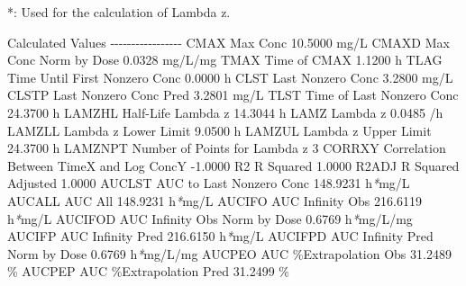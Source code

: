 \documentclass[
  11pt,
  krantz2, a4paper, twoside]{krantz}
\newenvironment{Shaded}{\begin{snugshade}}{\end{snugshade}}
\newcommand{\AttributeTok}[1]{\textcolor[rgb]{0.77,0.63,0.00}{#1}}
\newcommand{\ExtensionTok}[1]{#1}
\newcommand{\NormalTok}[1]{#1}
\newcommand{\PreprocessorTok}[1]{\textcolor[rgb]{0.56,0.35,0.01}{\textit{#1}}}
\theoremstyle{definition}
\theoremstyle{definition}
\theoremstyle{definition}
\theoremstyle{definition}
\theoremstyle{remark}
\begin{document}
\begin{Shaded}
\begin{Highlighting}[]
\ExtensionTok{*:}\NormalTok{ Used for the calculation of Lambda z.}


\ExtensionTok{Calculated}\NormalTok{ Values}
\ExtensionTok{{-}{-}{-}{-}{-}{-}{-}{-}{-}{-}{-}{-}{-}{-}{-}{-}{-}}
\ExtensionTok{CMAX}\NormalTok{       Max Conc                                       10.5000 mg/L}
\ExtensionTok{CMAXD}\NormalTok{      Max Conc Norm by Dose                           0.0328 mg/L/mg}
\ExtensionTok{TMAX}\NormalTok{       Time of CMAX                                    1.1200 h}
\ExtensionTok{TLAG}\NormalTok{       Time Until First Nonzero Conc                   0.0000 h}
\ExtensionTok{CLST}\NormalTok{       Last Nonzero Conc                               3.2800 mg/L}
\ExtensionTok{CLSTP}\NormalTok{      Last Nonzero Conc Pred                          3.2801 mg/L}
\ExtensionTok{TLST}\NormalTok{       Time of Last Nonzero Conc                      24.3700 h}
\ExtensionTok{LAMZHL}\NormalTok{     Half{-}Life Lambda z                             14.3044 h}
\ExtensionTok{LAMZ}\NormalTok{       Lambda z                                        0.0485 /h}
\ExtensionTok{LAMZLL}\NormalTok{     Lambda z Lower Limit                            9.0500 h}
\ExtensionTok{LAMZUL}\NormalTok{     Lambda z Upper Limit                           24.3700 h}
\ExtensionTok{LAMZNPT}\NormalTok{    Number of Points for Lambda z                   3}
\ExtensionTok{CORRXY}\NormalTok{     Correlation Between TimeX and Log ConcY        }\AttributeTok{{-}1.0000} 
\ExtensionTok{R2}\NormalTok{         R Squared                                       1.0000 }
\ExtensionTok{R2ADJ}\NormalTok{      R Squared Adjusted                              1.0000 }
\ExtensionTok{AUCLST}\NormalTok{     AUC to Last Nonzero Conc                      148.9231 h}\PreprocessorTok{*}\NormalTok{mg/L}
\ExtensionTok{AUCALL}\NormalTok{     AUC All                                       148.9231 h}\PreprocessorTok{*}\NormalTok{mg/L}
\ExtensionTok{AUCIFO}\NormalTok{     AUC Infinity Obs                              216.6119 h}\PreprocessorTok{*}\NormalTok{mg/L}
\ExtensionTok{AUCIFOD}\NormalTok{    AUC Infinity Obs Norm by Dose                   0.6769 h}\PreprocessorTok{*}\NormalTok{mg/L/mg}
\ExtensionTok{AUCIFP}\NormalTok{     AUC Infinity Pred                             216.6150 h}\PreprocessorTok{*}\NormalTok{mg/L}
\ExtensionTok{AUCIFPD}\NormalTok{    AUC Infinity Pred Norm by Dose                  0.6769 h}\PreprocessorTok{*}\NormalTok{mg/L/mg}
\ExtensionTok{AUCPEO}\NormalTok{     AUC \%Extrapolation Obs                         31.2489 \%}
\ExtensionTok{AUCPEP}\NormalTok{     AUC \%Extrapolation Pred                        31.2499 \%}

\end{Highlighting}
\end{Shaded}
\end{document}
